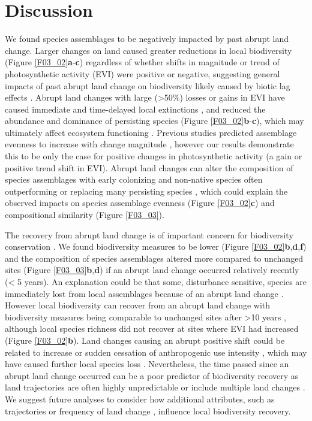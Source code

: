 \section{Discussion}
\label{C03_04}
We found species assemblages to be negatively impacted by past abrupt land change. Larger changes on land caused greater reductions in local biodiversity (Figure \ref{F03_02}\textbf{a}-\textbf{c}) regardless of whether shifts in magnitude or trend of photosynthetic activity (EVI) were positive or negative, suggesting general impacts of past abrupt land change on biodiversity \citep{Dornelas2010,Hautier2015} likely caused by biotic lag effects \citep{Hylander2013,Ogle2015,Jung2018}. Abrupt land changes with large (>50\%) losses or gains in EVI have caused immediate and time-delayed local extinctions \citep{Krauss2010,Halley2016,Wood2017}, and reduced the abundance and dominance of persisting species (Figure \ref{F03_02}\textbf{b}-\textbf{c}), which may ultimately affect ecosystem functioning \citep{Hautier2015,Isbell2015}. Previous studies predicted assemblage evenness to increase with change magnitude \citep{Svensson2012}, however our results demonstrate this to be only the case for positive changes in photosynthetic activity (\ie a gain or positive trend shift in EVI). Abrupt land changes can alter the composition of species assemblages with early colonizing and non-native species often outperforming or replacing many persisting species \citep{Fraterrigo2006,Turner2010,Jauni2015}, which could explain the observed impacts on species assemblage evenness (Figure \ref{F03_02}\textbf{c}) and compositional similarity (Figure \ref{F03_03}).

The recovery from abrupt land change is of important concern for biodiversity conservation \citep{Chazdon2003}. We found biodiversity measures to be lower (Figure \ref{F03_02}\textbf{b},\textbf{d},\textbf{f}) and the composition of species assemblages altered more compared to unchanged sites (Figure \ref{F03_03}\textbf{b},\textbf{d}) if an abrupt land change occurred relatively recently (< 5 years). An explanation could be that some, disturbance sensitive, species are immediately lost from local assemblages because of an abrupt land change \citep{Devictor2008,Supp2014}. However local biodiversity can recover from an abrupt land change with biodiversity measures being comparable to unchanged sites after >10 years \citep{Martin2013,Moreno-Mateos2017}, although local species richness did not recover at sites where EVI had increased (Figure \ref{F03_02}\textbf{b}). Land changes causing an abrupt positive shift could be related to increase or sudden cessation of anthropogenic use intensity \citep{Eastman2013,Muller2014}, which may have caused further local species loss \citep{Tilman1994,Balmford1996,Hylander2013}. Nevertheless, the time passed since an abrupt land change occurred can be a poor predictor of biodiversity recovery as land trajectories are often highly unpredictable \citep{Norden2015} or include multiple land changes \citep{Watson2014}. We suggest future analyses to consider how additional attributes, such as trajectories or frequency of land change \citep{Watson2014}, influence local biodiversity recovery. 

